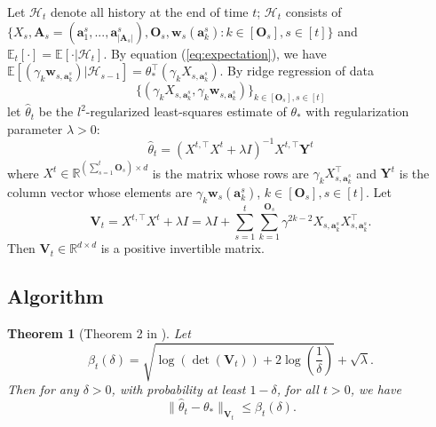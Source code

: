 \documentclass{article}
\newcommand{\bA}{\mathbf{A}}
\newcommand{\ba}{\mathbf{a}}
\newcommand{\bO}{\mathbf{O}}
\newcommand{\bV}{\mathbf{V}}
\newcommand{\bw}{\mathbf{w}}
\newcommand{\bY}{\mathbf{Y}}
\newcommand{\cH}{\mathcal{H}}
\newcommand{\EE}{\mathbb{E}}
\newcommand{\RR}{\mathbb{R}}
\newcommand{\abs}[1]{\left| #1 \right|}
\newcommand{\norm}[1]{\| #1 \|}
\newtheorem{theorem}{Theorem}[section]
\begin{document}
	Let $\cH_t$ denote all history at the end of time $t$; $\cH_t$ consists of $\{X_s, \bA_s=(\ba_{1}^s,...,\ba_{\abs{\bA_s}}^s), \bO_s, \bw_s(\ba_k^s): k \in[\bO_s], s\in[t] \}$ and $\EE_t[\cdot] = \EE[\cdot | \cH_t]$. By equation (\ref{eq:expectation}), we have $\EE[(\gamma_k\bw_{s,\ba_k^s}) | \cH_{s-1}] = \theta_*^{\top} (\gamma_k X_{s,\ba_k^s})$. By ridge regression of data 
	$$
	\{(\gamma_k X_{s,\ba_k^s}, \gamma_k\bw_{s,\ba_k^s})\}_{k \in[\bO_s], s\in[t]}
	$$
	let $\hat{\theta}_t$ be the $l^2$-regularized least-squares estimate of $\theta_*$ with regularization parameter $\lambda > 0$:
	\begin{equation}
	\hat{\theta}_t = (X^{t,\top}X^{t} + \lambda I)^{-1} X^{t, \top} \bY^t
	\end{equation}
	where $X^t \in \RR^{(\sum_{s=1}^{t}\bO_s) \times d}$ is the matrix whose rows are $\gamma_k X_{s,\ba_k^s}^{\top}$ and $\bY^t$ is the column vector whose elements are $\gamma_k \bw_s(\ba_k^s)$, $k \in[\bO_s], s\in[t]$. Let
	$$
	\bV_t = X^{t,\top}X^{t} + \lambda I = \lambda I + \sum_{s=1}^{t} \sum_{k=1}^{\bO_s} \gamma^{2k-2}X_{s,\ba_k^s}X_{s,\ba_k^s}^{\top}.
	$$
	Then $\bV_t \in \RR^{d \times d}$ is a positive invertible matrix.
	\subsection{Algorithm}
	
	\begin{theorem}[Theorem 2 in \cite{abbasi2011improved}]
		\label{thm:theta_estimate}
		Let 
		$$
		\beta_{t}(\delta) = \sqrt{\log(\det(\bV_{t})) + 2 \log(\frac{1}{\delta})} + \sqrt{\lambda}.
		$$
		Then for any $\delta > 0$, with probability at least $1 - \delta$, for all $t > 0$, we have
		\begin{equation}
		\norm{\hat{\theta}_t - \theta_*}_{\bV_{t}} \leq \beta_{t}(\delta).
		\end{equation}
	\end{theorem}
	
\end{document}
